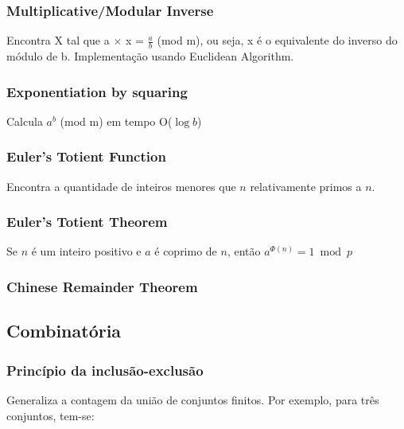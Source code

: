 \divisor

\subsubsection{Multiplicative/Modular Inverse}
Encontra X tal que a $\times$ x = $\frac{a}{b}$ (mod m), ou seja, x é o equivalente do inverso do módulo de b. Implementação usando Euclidean Algorithm.
\divisor

\subsubsection{Exponentiation by squaring}
Calcula $a^b$ (mod m) em tempo O($\log{b}$)
\divisor

\subsubsection{Euler's Totient Function}
Encontra a quantidade de inteiros menores que $n$ relativamente primos a $n$.
\divisor

\subsubsection{Euler's Totient Theorem}
Se $n$ \'{e} um inteiro positivo e $a$ \'{e} coprimo de $n$, ent\~{a}o
$a^{\Phi (n) } = 1 \bmod{p}$
\divisor

\subsubsection{Chinese Remainder Theorem}
\divisor


\subsection{Combinat\'{o}ria}

\subsubsection{Princ\'{i}pio da inclus\~{a}o-exclus\~{a}o}
Generaliza a contagem da uni\~{a}o de conjuntos finitos. Por exemplo, para tr\^{e}s conjuntos, tem-se:

